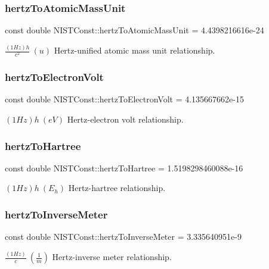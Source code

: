 \subsubsection{\texorpdfstring{hertz\+To\+Atomic\+Mass\+Unit}{hertzToAtomicMassUnit}}
{\footnotesize\ttfamily const double N\+I\+S\+T\+Const\+::hertz\+To\+Atomic\+Mass\+Unit = 4.\+4398216616e-\/24}

$\frac{(1 Hz)h}{c^2} \ (u)$ Hertz-\/unified atomic mass unit relationship. \mbox{\label{group___hertz_ga035f43de5d8ad8208675c53a0057d14d}} 
\subsubsection{\texorpdfstring{hertz\+To\+Electron\+Volt}{hertzToElectronVolt}}
{\footnotesize\ttfamily const double N\+I\+S\+T\+Const\+::hertz\+To\+Electron\+Volt = 4.\+135667662e-\/15}

$(1 Hz)h \ (eV)$ Hertz-\/electron volt relationship. \mbox{\label{group___hertz_ga2ededb8b750b44cde6d83c1c07b6a870}} 
\subsubsection{\texorpdfstring{hertz\+To\+Hartree}{hertzToHartree}}
{\footnotesize\ttfamily const double N\+I\+S\+T\+Const\+::hertz\+To\+Hartree = 1.\+5198298460088e-\/16}

$(1 Hz)h \ (E_h)$ Hertz-\/hartree relationship. \mbox{\label{group___hertz_ga6d5ccd7fed8ad7f2abb5c368565a1666}} 
\subsubsection{\texorpdfstring{hertz\+To\+Inverse\+Meter}{hertzToInverseMeter}}
{\footnotesize\ttfamily const double N\+I\+S\+T\+Const\+::hertz\+To\+Inverse\+Meter = 3.\+335640951e-\/9}

$\frac{(1 Hz)}{c} \ (\frac{1}{m})$ Hertz-\/inverse meter relationship. \mbox{\label{group___hertz_ga827c4e99287fcd5363fabcfe1381cc37}} 
